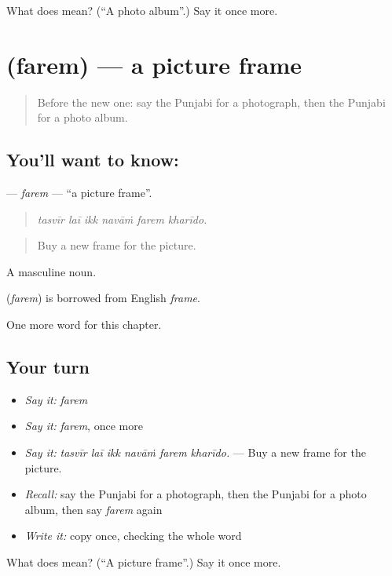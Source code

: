 \begin{tcolorbox}[breakable,colback=teal!4,colframe=teal!35!black,title={Before you move on}]
What does  mean? (\textquotedblleft{}A photo album\textquotedblright{}.) Say it once more.
\end{tcolorbox}
\section[\texorpdfstring{\pa{ਫ਼ਰੇਮ} (farem)}{ਫ਼ਰੇਮ (farem)}]{ (farem) — a picture frame}

\label{lesson:PA-C356-farem}



\begin{quote}
Before the new one: say the Punjabi for a photograph, then the Punjabi for a photo album.
\end{quote}

\subsection*{You'll want to know: }
\textbf{} — \emph{farem} — \textquotedblleft{}a picture frame\textquotedblright{}.

\begin{quote}
     
\end{quote}

\begin{quote}
\emph{tasvīr laī ikk navāṁ farem kharīdo.}
\end{quote}

\begin{quote}
Buy a new frame for the picture.
\end{quote}

A masculine noun.

\begin{cousinweb}
\textbf{} (\emph{farem}) is borrowed from English \emph{frame}.
\end{cousinweb}

\begin{grammarlens}[title={What you've built}]
One more word for this chapter.
\end{grammarlens}

\subsection*{Your turn}
\begin{itemize}
\raggedright
  \item \emph{Say it:} \emph{farem}
  \item \emph{Say it:} \emph{farem}, once more
  \item \emph{Say it:} \emph{tasvīr laī ikk navāṁ farem kharīdo.} — Buy a new frame for the picture.
  \item \emph{Recall:} say the Punjabi for a photograph, then the Punjabi for a photo album, then say \emph{farem} again
  \item \emph{Write it:} copy \textbf{} once, checking the whole word
\end{itemize}

\begin{tcolorbox}[breakable,colback=teal!4,colframe=teal!35!black,title={Before you move on}]
What does  mean? (\textquotedblleft{}A picture frame\textquotedblright{}.) Say it once more.
\end{tcolorbox}
